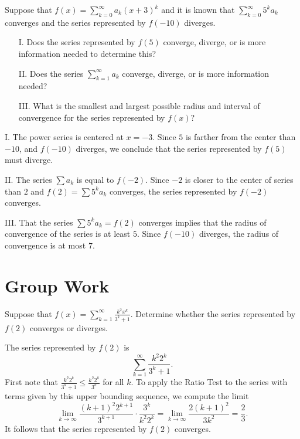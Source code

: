 \documentclass[]{ximera}
\begin{document}
\begin{problem} 
Suppose that $f(x) = \sum_{k=0}^{\infty} a_k (x+3)^k$ and it is known that $\sum_{k=0}^{\infty} 5^k a_k$ converges and the series represented by $f(-10)$ diverges.

\begin{itemize}
\item[I.] Does the series represented by $f(5)$ converge, diverge, or is more information needed to determine this?
\item[II.] Does the series $\sum_{k=1}^{\infty} a_k$ converge, diverge, or is more information needed?
\item[III.] What is the smallest and largest possible radius and interval of convergence for the series represented by $f(x)$?
\end{itemize}


\begin{freeResponse}
I. The power series is centered at $x=-3$.  Since $5$ is farther from the center than $-10$, and $f(-10)$ diverges, we conclude that the series represented by $f(5)$ must diverge.

II. The series $\sum a_k$ is equal to $f(-2)$. Since $-2$ is closer to the center of series than $2$ and  $f(2) = \sum 5^k a_k$ converges, the series represented by $f(-2)$ converges.

III. That the series $\sum 5^k a_k = f(2)$ converges implies that the radius of convergence of the series is at least $5$. Since $f(-10)$ diverges, the radius of convergence is at most $7$.
\end{freeResponse}
\end{problem}


\section{Group Work}


\begin{problem} 
Suppose that $f(x) = \sum_{k=1}^{\infty} \frac{k^2x^k}{3^k+1}$.  Determine whether the series represented by $f(2)$ converges or diverges.


\begin{freeResponse}
The series represented by $f(2)$ is 
$$
\sum_{k=1}^{\infty} \frac{k^2 2^k}{3^k+1}.
$$
First note that $\frac{k^2 2^k}{3^k+1} \leq \frac{k^2 2^k}{3^k}$ for all $k$. To apply the Ratio Test to the series with terms given by this upper bounding sequence, we compute the limit
$$
\lim_{k\rightarrow \infty} \frac{(k+1)^2 2^{k+1}}{3^{k+1}} \cdot \frac{3^k}{k^2 2^k} = \lim_{k\rightarrow \infty} \frac{2(k+1)^2}{3k^2} = \frac{2}{3}.
$$
It follows that the series represented by $f(2)$ converges.
\end{freeResponse}
\end{problem}
\end{document}
